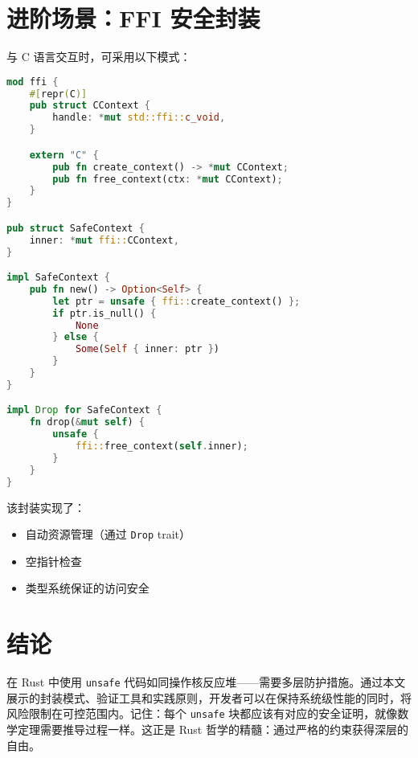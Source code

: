 \chapter{进阶场景：FFI 安全封装}
与 C 语言交互时，可采用以下模式：\par
\begin{lstlisting}[language=rust]
mod ffi {
    #[repr(C)]
    pub struct CContext {
        handle: *mut std::ffi::c_void,
    }

    extern "C" {
        pub fn create_context() -> *mut CContext;
        pub fn free_context(ctx: *mut CContext);
    }
}

pub struct SafeContext {
    inner: *mut ffi::CContext,
}

impl SafeContext {
    pub fn new() -> Option<Self> {
        let ptr = unsafe { ffi::create_context() };
        if ptr.is_null() {
            None
        } else {
            Some(Self { inner: ptr })
        }
    }
}

impl Drop for SafeContext {
    fn drop(&mut self) {
        unsafe {
            ffi::free_context(self.inner);
        }
    }
}
\end{lstlisting}
该封装实现了：\par
\begin{itemize}
\item 自动资源管理（通过 \verb!Drop! trait）
\item 空指针检查
\item 类型系统保证的访问安全
\end{itemize}
\chapter{结论}
在 Rust 中使用 \verb!unsafe! 代码如同操作核反应堆——需要多层防护措施。通过本文展示的封装模式、验证工具和实践原则，开发者可以在保持系统级性能的同时，将风险限制在可控范围内。记住：每个 \verb!unsafe! 块都应该有对应的安全证明，就像数学定理需要推导过程一样。这正是 Rust 哲学的精髓：通过严格的约束获得深层的自由。\par
